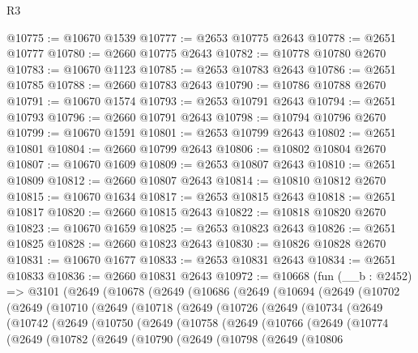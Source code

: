 \begin{lexlean}{R3}
\begin{coremodule}
@10775 := @10670 @1539
@10777 := @2653 @10775 @2643
@10778 := @2651 @10777
@10780 := @2660 @10775 @2643
@10782 := @10778 @10780 @2670
@10783 := @10670 @1123
@10785 := @2653 @10783 @2643
@10786 := @2651 @10785
@10788 := @2660 @10783 @2643
@10790 := @10786 @10788 @2670
@10791 := @10670 @1574
@10793 := @2653 @10791 @2643
@10794 := @2651 @10793
@10796 := @2660 @10791 @2643
@10798 := @10794 @10796 @2670
@10799 := @10670 @1591
@10801 := @2653 @10799 @2643
@10802 := @2651 @10801
@10804 := @2660 @10799 @2643
@10806 := @10802 @10804 @2670
@10807 := @10670 @1609
@10809 := @2653 @10807 @2643
@10810 := @2651 @10809
@10812 := @2660 @10807 @2643
@10814 := @10810 @10812 @2670
@10815 := @10670 @1634
@10817 := @2653 @10815 @2643
@10818 := @2651 @10817
@10820 := @2660 @10815 @2643
@10822 := @10818 @10820 @2670
@10823 := @10670 @1659
@10825 := @2653 @10823 @2643
@10826 := @2651 @10825
@10828 := @2660 @10823 @2643
@10830 := @10826 @10828 @2670
@10831 := @10670 @1677
@10833 := @2653 @10831 @2643
@10834 := @2651 @10833
@10836 := @2660 @10831 @2643
@10972 := @10668
    (fun (__b : @2452) =>
    @3101
      (@2649
        (@10678
          (@2649
            (@10686
              (@2649
                (@10694
                  (@2649
                    (@10702
                      (@2649
                        (@10710
                          (@2649
                            (@10718
                              (@2649
                                (@10726
                                  (@2649
                                    (@10734
                                      (@2649
                                        (@10742
                                          (@2649
                                            (@10750
                                              (@2649
                                                (@10758
                                                  (@2649
                                                    (@10766
                                                      (@2649
                                                        (@10774
                                                          (@2649
                                                            (@10782
                                                              (@2649
                                                                (@10790
                                                                  (@2649
                                                                    (@10798
                                                                      (@2649
                                                                        (@10806

\end{coremodule}
\end{lexlean}
